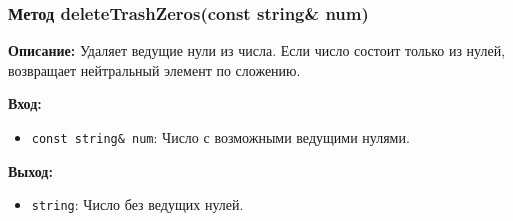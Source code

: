 





\subsubsection{Метод deleteTrashZeros(const string\& num)}

\textbf{Описание:} Удаляет ведущие нули из числа.  Если число состоит только из нулей, возвращает нейтральный элемент по сложению.

\textbf{Вход:}
\begin{itemize}
    \item \texttt{const string\& num}: Число с возможными ведущими нулями. 
\end{itemize}

\textbf{Выход: }
\begin{itemize}
    \item \texttt{string}: Число без ведущих нулей.
\end{itemize}

